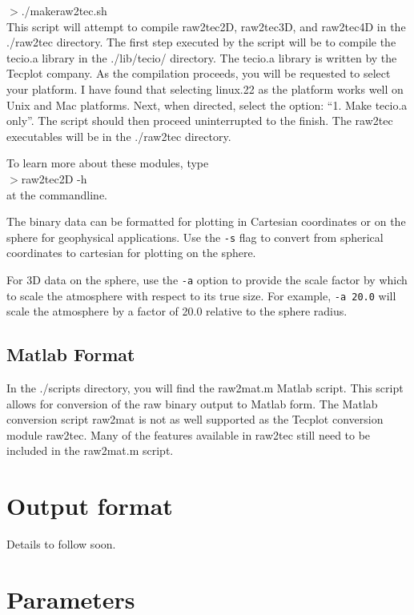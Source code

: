\documentclass[11pt]{article}
\begin{document}
\noindent$>$./makeraw2tec.sh\\

\noindent This script will attempt to compile raw2tec2D, raw2tec3D, and raw2tec4D in the ./raw2tec directory.  The first step executed by the script will be to compile the tecio.a library in the ./lib/tecio/ directory.  The tecio.a library is written by the Tecplot company.  As the compilation proceeds, you will be requested to select your platform.  I have found that selecting linux.22 as the platform works well on Unix and Mac platforms.  Next, when directed, select the option: ``1. Make tecio.a only''.  The script should then proceed uninterrupted to the finish.  The raw2tec executables will be in the ./raw2tec directory.

\medskip

To learn more about these modules, type\\

\noindent$>$raw2tec2D -h\\

at the commandline.

The binary data can be formatted for plotting in Cartesian coordinates or on the sphere for geophysical applications.  Use the \texttt{-s} flag to convert from spherical coordinates to cartesian for plotting on the sphere.

For 3D data on the sphere, use the \texttt{-a} option to provide the scale factor by which to scale the atmosphere with respect to its true size.  For example, \texttt{-a 20.0} will scale the atmosphere by a factor of 20.0 relative to the sphere radius.

\subsection{Matlab Format}
In the ./scripts directory, you will find the raw2mat.m Matlab script.  This script allows for conversion of the raw binary output to Matlab form.   The Matlab conversion script raw2mat is not as well supported as the Tecplot conversion module raw2tec.  Many of the features available in raw2tec still need to be included in the raw2mat.m script.

\section{Output format}
\label{binary}
Details to follow soon.

\section{Parameters}
\label{parameters}
\end{document}
